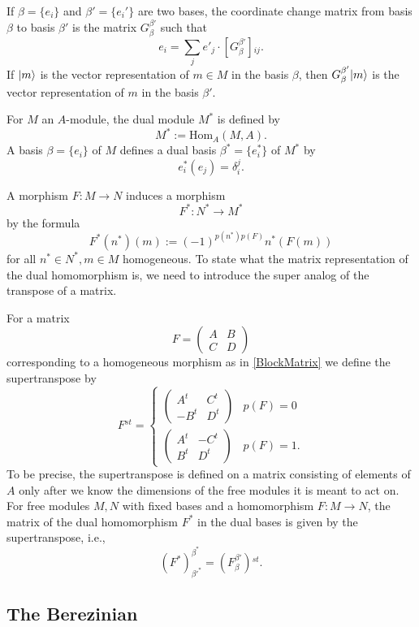 \documentclass[11pt]{amsart}
\numberwithin{equation}{section}
\numberwithin{figure}{section}
\theoremstyle{plain}
\theoremstyle{definition}
\theoremstyle{remark}
\begin{document}
If $\beta=\{e_{i}\}$ and $\beta'=\{e_{i}'\}$ are two bases, the
coordinate change matrix from basis $\beta$ to basis $\beta'$ is
the matrix $G_{\beta}^{\beta'}$ such that 
\[
e_{i}=\sum_{j}e'_{j}\cdot[G_{\beta}^{\beta'}]{}_{ij}.
\]
If $|m\rangle$ is the vector representation of $m\in M$ in the basis
$\beta$, then $G_{\beta}^{\beta'}|m\rangle$ is the vector representation
of $m$ in the basis $\beta'$. 

For $M$ an $A$-module, the dual module $M^{*}$ is defined by 
\[
M^{*}:=\mbox{Hom}_{A}(M,A).
\]
A basis $\beta=\{e_{i}\}$ of $M$ defines a dual basis $\beta^{*}=\{e_{i}^{*}\}$
of $M^{*}$ by 
\[
e_{i}^{*}(e_{j})=\delta_{i}^{j}.
\]


A morphism $F:M\rightarrow N$ induces a morphism 
\[
F^{*}:N^{*}\rightarrow M^{*}
\]
by the formula 
\[
F^{*}(n^{*})(m):=(-1)^{p(n^{*})p(F)}n^{*}\left(F(m)\right)
\]
for all $n^{*}\in N^{*},m\in M$ homogeneous. To state what the matrix
representation of the dual homomorphism is, we need to introduce the
super analog of the transpose of a matrix. 

For a matrix 
\[
F=\left(\begin{matrix}A & B\\
C & D
\end{matrix}\right)
\]
corresponding to a homogeneous morphism as in \eqref{BlockMatrix}
we define the supertranspose by 
\[
F{}^{st}=\begin{cases}
\left(\begin{matrix}A^{t} & C^{t}\\
-B^{t} & D^{t}
\end{matrix}\right) & p(F)=0\\
\left(\begin{matrix}A^{t} & -C^{t}\\
B^{t} & D^{t}
\end{matrix}\right) & p(F)=1.
\end{cases}
\]
To be precise, the supertranspose is defined on a matrix consisting
of elements of $A$ only after we know the dimensions of the free
modules it is meant to act on. For free modules $M,N$ with fixed
bases and a homomorphism $F:M\rightarrow N$, the matrix of the dual
homomorphism $F^{*}$ in the dual bases is given by the supertranspose,
i.e.,
\[
(F^{*})_{\beta'^{*}}^{\beta^{*}}=\left(F_{\beta}^{\beta'}\right){}^{st}.
\]



\subsection{The Berezinian\label{sub:The-Berezinian}}
\end{document}
